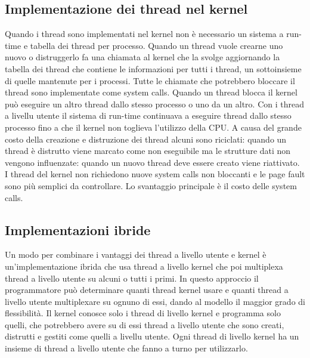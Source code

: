 \subsection{Implementazione dei thread nel kernel}
Quando i thread sono implementati nel kernel non \`e necessario un sistema a run-time e tabella dei thread per processo. Quando un thread vuole crearne uno nuovo o distruggerlo fa una
chiamata al kernel che la svolge aggiornando la tabella dei thread che contiene le informazioni per tutti i thread, un sottoinsieme di quelle mantenute per i processi. Tutte le chiamate
che potrebbero bloccare il thread sono implementate come system calls. Quando un thread blocca il kernel pu\`o eseguire un altro thread dallo stesso processo o uno da un altro. Con i 
thread a livellu utente il sistema di run-time continuava a eseguire thread dallo stesso processo fino a che il kernel non toglieva l'utilizzo della CPU. A causa del grande costo della
creazione e distruzione dei thread alcuni sono riciclati: quando un thread \`e distrutto viene marcato come non eseguibile ma le strutture dati non vengono influenzate: quando un nuovo
thread deve essere creato viene riattivato. I thread del kernel non richiedono nuove system calls non bloccanti e le page fault sono pi\`u semplici da controllare. Lo svantaggio 
principale \`e il costo delle system calls. 
\subsection{Implementazioni ibride}
Un modo per combinare i vantaggi dei thread a livello utente e kernel \`e un'implementazione ibrida che usa thread a livello kernel che poi multiplexa thread a livello utente su alcuni
o tutti i primi. In questo approccio il programmatore pu\`o determinare quanti thread kernel usare e quanti thread a livello utente multiplexare su ognuno di essi, dando al modello il
maggior grado di flessibilit\`a. Il kernel conosce solo i thread di livello kernel e programma solo quelli, che potrebbero avere su di essi thread a livello utente che sono creati,
distrutti e gestiti come quelli a livellu utente. Ogni thread di livello kernel ha un insieme di thread a livello utente che fanno a turno per utilizzarlo.
